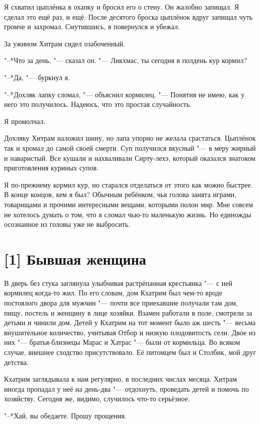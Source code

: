 Я схватил цыплёнка в охапку и бросил его о стену.
Он жалобно запищал.
Я сделал это ещё раз, и ещё.
После десятого броска цыплёнок вдруг запищал чуть громче и захромал.
Смутившись, я повернулся и убежал.

За ужином Хитрам сидел озабоченный.

"--*Что за день, "--- сказал он.
"--- Ликхмас, ты сегодня в полдень кур кормил?

"--*Да, "--- буркнул я.

"--*Дохляк лапку сломал, "--- объяснил кормилец.
"--- Понятия не имею, как у него это получилось.
Надеюсь, что это простая случайность.

Я промолчал.

Дохляку Хитрам наложил шину, но лапа упорно не желала срастаться.
Цыплёнок так и хромал до самой своей смерти.
Суп получился вкусный "--- в меру жирный и наваристый.
Все кушали и нахваливали Сирту-лехэ, который оказался знатоком приготовления куриных супов.

Я по-прежнему кормил кур, но старался отделаться от этого как можно быстрее.
В конце концов, кем я был?
Обычным ребёнком, чья голова занята играми, товарищами и прочими интересными вещами, которыми полон мир.
Мне совсем не хотелось думать о том, что я сломал чью-то маленькую жизнь.
Но единожды осознанное из головы уже не выбросить.

\section{[1] Бывшая женщина}

В дверь без стука заглянула улыбчивая растрёпанная крестьянка "--- с ней кормилец когда-то жил.
По его словам, дом Кхатрим был чем-то вроде постоялого двора для мужчин "--- почти все приехавшие получали там дом, пищу, постель и женщину в лице хозяйки.
Взамен работали в поле, смотрели за детьми и чинили дом.
Детей у Кхатрим на тот момент было аж шесть "--- весьма внушительное количество, учитывая Отбор и низкую плодовитость сели.
Двое из них "--- братья-близнецы Марас и Хатрас "--- были от кормильца.
Во всяком случае, внешнее сходство присутствовало.
Её питомцем был и Столбик, мой друг детства.

Кхатрим заглядывала к нам регулярно, в последних числах месяца.
Хитрам иногда пропадал у неё на день-два "--- отдохнуть, проведать детей и помочь по хозяйству.
Сегодня же, видимо, случилось что-то серьёзное.

"--*Хай, вы обедаете.
Прошу прощения.

